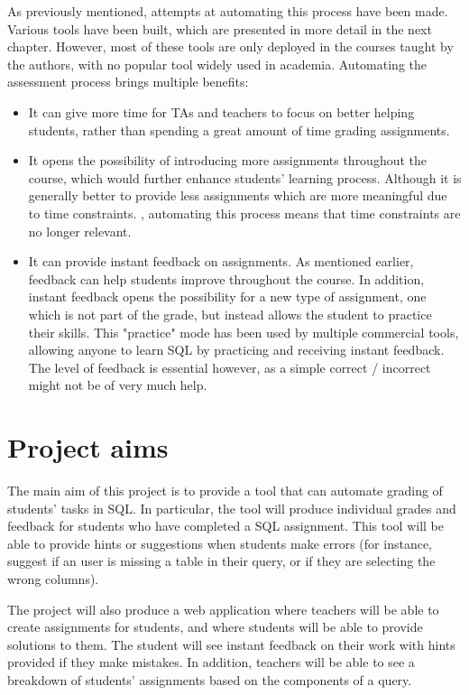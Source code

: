 As previously mentioned, attempts at automating this process have been made. Various tools have been built, which are presented in more detail in the next chapter. However, most of these tools are only deployed in the courses taught by the authors, with no popular tool widely used in academia. Automating the assessment process brings multiple benefits:
\begin{itemize}
    \item It can give more time for TAs and teachers to focus on better helping students, rather than spending a great amount of time grading assignments.
    \item It opens the possibility of introducing more assignments throughout the course, which would further enhance students' learning process. Although it is generally better to provide less assignments which are more meaningful due to time constraints. \citep{literature:assement}, automating this process means that time constraints are no longer relevant.
    \item It can provide instant feedback on assignments. As mentioned earlier, feedback can help students improve throughout the course. In addition, instant feedback opens the possibility for a new type of assignment, one which is not part of the grade, but instead allows the student to practice their skills. This "practice" mode has been used by multiple commercial tools, allowing anyone to learn SQL by practicing and receiving instant feedback. The level of feedback is essential however, as a simple correct / incorrect might not be of very much help.
\end{itemize}


\section{Project aims} \label{ch:introduction:sec:project_aims}

The main aim of this project is to provide a tool that can automate grading of students' tasks in SQL. In particular, the tool will produce individual grades and feedback for students who have completed a SQL assignment. This tool will be able to provide hints or suggestions when students make errors (for instance, suggest if an user is missing a table in their query, or if they are selecting the wrong columns).

The project will also produce a web application where teachers will be able to create assignments for students, and where students will be able to provide solutions to them. The student will see instant feedback on their work with hints provided if they make mistakes. In addition, teachers will be able to see a breakdown of students' assignments based on the components of a query.

